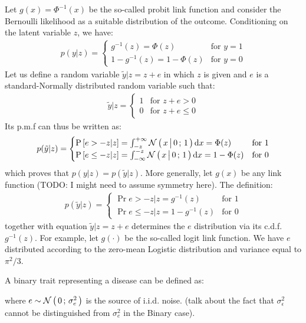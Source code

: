 Let $g(x) = \Phi^{-1}(x)$ be the so-called probit link function and consider the
Bernoulli likelihood as a suitable distribution of the outcome. Conditioning on
the latent variable $z$, we have:
\begin{align*}
  p(y|z) = \begin{cases}
  g^{-1}(z) = \Phi(z) & \text{for } y = 1\\
  1-g^{-1}(z) = 1-\Phi(z) & \text{for } y = 0
  \end{cases}
\end{align*}
Let us define a random variable $\tilde y | z = z + e$ in which $z$ is given and
$e$ is a standard-Normally distributed random variable such that:
\begin{align*}
  \tilde y | z = \begin{cases}
  1 & \text{for } z + e > 0\\
  0 & \text{for } z + e \leq 0
  \end{cases}
\end{align*}
Its p.m.f can thus be written as:
\begin{align*}
  p(\tilde y | z) = \begin{cases}
  \text{P}\left[ {e > -z | z} \right] = \int_{-z}^{+\infty} \mathcal{N}\left(\, { {x} \, \big| \, {0} } \,;\, { {1} } \,\right) \mathrm d x = \Phi(z)  & \text{for } 1\\
  \text{P}\left[ {e \leq -z | z} \right] = \int_{-\infty}^{-z} \mathcal{N}\left(\, { {x} \, \big| \, {0} } \,;\, { {1} } \,\right) \mathrm d x = 1-\Phi(z) & \text{for } 0
  \end{cases}
\end{align*}
which proves that $p(y|z) = p(\tilde y|z)$. More generally, let $g(x)$ be any
link function (TODO: I might need to assume symmetry here). The definition:
\begin{align*}
  p(\tilde y | z) = \begin{cases}
  \Pr{e > -z | z} = g^{-1}(z)  & \text{for } 1\\
  \Pr{e \leq -z | z} = 1-g^{-1}(z) & \text{for } 0
  \end{cases}
\end{align*}
together with equation $\tilde y | z = z + e$ determines the $e$ distribution
via its c.d.f. $g^{-1}(z)$. For example, let $g(\cdot)$ be the so-called logit
link function. We have $e$ distributed according to the zero-mean Logistic
distribution and variance equal to $\pi^2/3$.



A binary trait representing a disease can be defined as:

where $e \sim \mathcal{N}\left(\, {0} \,;\, {\sigma_e^2} \,\right)$ is the source of i.i.d. noise. (talk about
the fact that $\sigma_{\epsilon}^2$ cannot be distinguished from $\sigma_e^2$ in
the Binary case).


